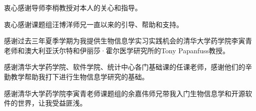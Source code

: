 
\begin{acknowledgements}
  衷心感谢导师李梢教授对本人的关心和指导。

  衷心感谢课题组汪博洋师兄一直以来的引导、帮助和支持。

  感谢过去三年夏季学期为我提供生物信息学实习实践机会的清华大学药学院李寅青老师和澳大利亚沃尔特和伊丽莎·霍尔医学研究所的Tony Papanfuss教授。

  感谢清华大学药学院、软件学院、统计中心各门基础课的任课老师，感谢他们的辛勤教学帮助我打下进行生物信息学研究的基础。

  感谢清华大学药学院李寅青老师课题组的余嘉伟师兄带我入门生物信息学和开源软件的世界，让我受益匪浅。
\end{acknowledgements}
